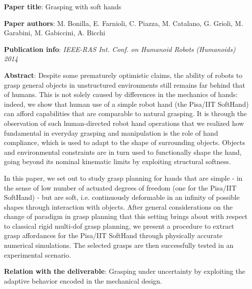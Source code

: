 
\item
\begin{list}{\quad}{}
\item \textbf{Paper title}: Grasping with soft hands
\item \textbf{Paper authors}: M. Bonilla, E. Farnioli, C. Piazza, M. Catalano, G. Grioli, M. Garabini, M. Gabiccini, A. Bicchi
\item\textbf{Publication info}: \textit{IEEE-RAS Int. Conf. on Humanoid Robots (Humanoids) 2014}
\item\textbf{Abstract}: 
  Despite some prematurely optimistic claims, the ability of robots to
  grasp general objects in unstructured environments still remains far
  behind that of humans. This is not solely caused by differences in
  the mechanics of hands: indeed, we show that human use of a simple
  robot hand (the Pisa/IIT SoftHand) can afford capabilities that are
  comparable to natural grasping. It is through the observation of
  such human-directed robot hand operations that we realized how
  fundamental in everyday grasping and manipulation is the role of
  hand compliance, which is used to adapt to the shape of surrounding
  objects. Objects and environmental constraints are in turn used to
  functionally shape the hand, going beyond its nominal kinematic
  limits by exploiting structural softness.

  In this paper, we set out to study grasp planning for hands that are
  simple - in the sense of low number of actuated degrees of freedom
  (one for the Pisa/IIT SoftHand) - but are soft, i.e. continuously
  deformable in an infinity of possible shapes through interaction
  with objects. After general considerations on the change of paradigm
  in grasp planning that this setting brings about with respect to
  classical rigid multi-dof grasp planning, we present a procedure to
  extract grasp affordances for the Pisa/IIT SoftHand through
  physically accurate numerical simulations. The
  selected grasps are then successfully tested in an experimental
  scenario.
\item \textbf{Relation with the deliverable}: Grasping under uncertainty by exploiting the adaptive behavior encoded in the mechanical design.
\end{list}